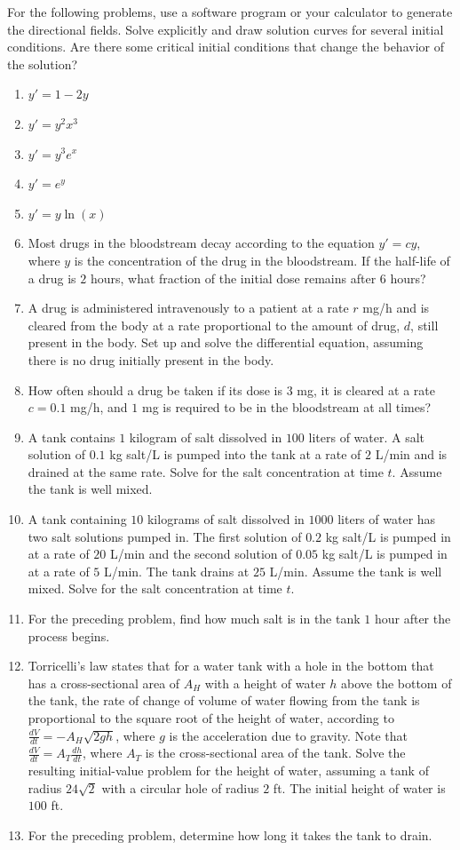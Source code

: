 \documentclass{exercises}
\begin{document}
For the following problems, use a software program or your calculator to generate the directional fields. Solve explicitly and draw solution curves for several initial conditions. Are there some critical initial conditions that change the behavior of the solution?

\begin{enumerate}[resume]
\item \techrequired $y'=1-2y$
\item \techrequired $y'=y^{2}x^{3}$
\item \techrequired $y'=y^{3}e^{x}$
\item \techrequired $y'=e^{y}$
\item \techrequired $y'=y\ln(x)$
\item Most drugs in the bloodstream decay according to the equation $y'=cy$, where $y$ is the concentration of the drug in the bloodstream. If the half-life of a drug is $2$ hours, what fraction of the initial dose remains after $6$ hours?
\item A drug is administered intravenously to a patient at a rate $r$ mg/h and is cleared from the body at a rate proportional to the amount of drug, $d$, still present in the body. Set up and solve the differential equation, assuming there is no drug initially present in the body.
\item \techrequired How often should a drug be taken if its dose is $3$ mg, it is cleared at a rate $c=0.1$ mg/h, and $1$ mg is required to be in the bloodstream at all times?
\item A tank contains $1$ kilogram of salt dissolved in $100$ liters of water. A salt solution of $0.1$ kg salt/L is pumped into the tank at a rate of $2$ L/min and is drained at the same rate. Solve for the salt concentration at time $t$. Assume the tank is well mixed.
\item A tank containing $10$ kilograms of salt dissolved in $1000$ liters of water has two salt solutions pumped in. The first solution of $0.2$ kg salt/L is pumped in at a rate of $20$ L/min and the second solution of $0.05$ kg salt/L is pumped in at a rate of $5$ L/min. The tank drains at $25$ L/min. Assume the tank is well mixed. Solve for the salt concentration at time $t$.
\item \techrequired For the preceding problem, find how much salt is in the tank $1$ hour after the process begins.
\item Torricelli's law states that for a water tank with a hole in the bottom that has a cross-sectional area of $A_{H}$ with a height of water $h$ above the bottom of the tank, the rate of change of volume of water flowing from the tank is proportional to the square root of the height of water, according to $\frac{dV}{dt}=-A_{H}\sqrt{2gh}$, where $g$ is the acceleration due to gravity. Note that $\frac{dV}{dt}=A_{T}\frac{dh}{dt}$, where $A_{T}$ is the cross-sectional area of the tank. Solve the resulting initial-value problem for the height of water, assuming a tank of radius $24\sqrt{2}$ with a circular hole of radius $2$ ft. The initial height of water is $100$ ft.
\item For the preceding problem, determine how long it takes the tank to drain.
\end{enumerate}
\end{document}

